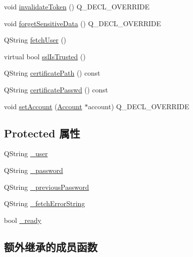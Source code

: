 \begin{DoxyCompactItemize}
\item 
void \hyperlink{class_o_c_c_1_1_http_credentials_a1ea63d4fa2bb42a61ce3bfde3332c754}{invalidate\+Token} () Q\+\_\+\+D\+E\+C\+L\+\_\+\+O\+V\+E\+R\+R\+I\+DE
\item 
void \hyperlink{class_o_c_c_1_1_http_credentials_a332002f8a742266ab26f7bc5eb1d4737}{forget\+Sensitive\+Data} () Q\+\_\+\+D\+E\+C\+L\+\_\+\+O\+V\+E\+R\+R\+I\+DE
\item 
Q\+String \hyperlink{class_o_c_c_1_1_http_credentials_ad7c0471a9595f80a03558bbbbfb2e278}{fetch\+User} ()
\item 
virtual bool \hyperlink{class_o_c_c_1_1_http_credentials_aa2d4f550f9f3dd29a280dea9ece2a0ef}{ssl\+Is\+Trusted} ()
\item 
Q\+String \hyperlink{class_o_c_c_1_1_http_credentials_ab6094da7334d34d1cce27e439d9ab444}{certificate\+Path} () const
\item 
Q\+String \hyperlink{class_o_c_c_1_1_http_credentials_a3e5fc4ef75516f5603579a566e1d3601}{certificate\+Passwd} () const
\item 
void \hyperlink{class_o_c_c_1_1_http_credentials_a630fbda6f313ade505f4bc69c99ed8c6}{set\+Account} (\hyperlink{class_o_c_c_1_1_account}{Account} $\ast$account) Q\+\_\+\+D\+E\+C\+L\+\_\+\+O\+V\+E\+R\+R\+I\+DE
\end{DoxyCompactItemize}
\subsection*{Protected 属性}
\begin{DoxyCompactItemize}
\item 
Q\+String \hyperlink{class_o_c_c_1_1_http_credentials_a9c8dc6457478a29075dff70cfb72d8c0}{\+\_\+user}
\item 
Q\+String \hyperlink{class_o_c_c_1_1_http_credentials_a5fdde3ca18af5a53b1745a3546d46549}{\+\_\+password}
\item 
Q\+String \hyperlink{class_o_c_c_1_1_http_credentials_adddcec24c685a5b3816c7c4e6c4d8b14}{\+\_\+previous\+Password}
\item 
Q\+String \hyperlink{class_o_c_c_1_1_http_credentials_a9c2d6ae8de7b3b904914b8feba4ad7bc}{\+\_\+fetch\+Error\+String}
\item 
bool \hyperlink{class_o_c_c_1_1_http_credentials_ab526c2ca7f38114ab07e6cc5c07ce5a3}{\+\_\+ready}
\end{DoxyCompactItemize}
\subsection*{额外继承的成员函数}


